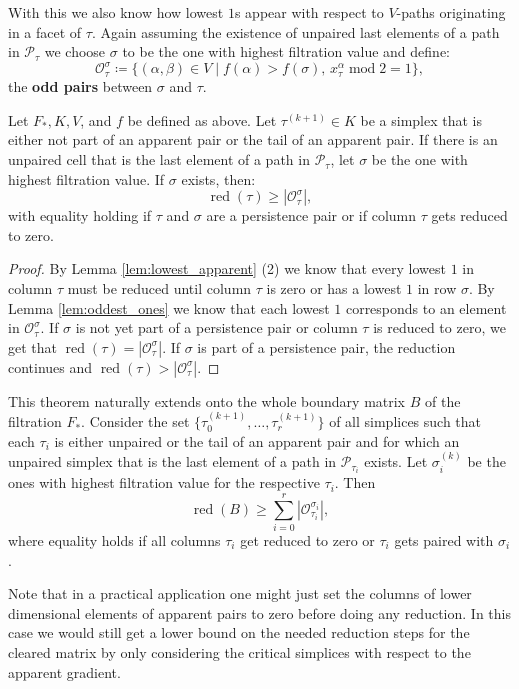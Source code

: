 With this we also know how lowest $1$s appear with respect to $V$-paths originating in a facet of $\tau$. Again assuming the existence of unpaired last elements of a path in $\mathcal{P}_\tau$ we choose $\sigma$ to be the one with highest filtration value and define: \[
\mathcal{O}_\tau^\sigma \coloneqq \{(\alpha, \beta) \in V \mid f(\alpha) > f(\sigma), \, x_\tau^\alpha \operatorname{mod} 2 = 1 \},
\]
the \textbf{odd pairs} between $\sigma$ and $\tau$. 

\begin{thm}
\label{thm:vpath_delta}
Let $F_*,K,V$, and $f$ be defined as above. Let $\tau^{(k+1)}\in K$ be a simplex that is either not part of an apparent pair or the tail of an apparent pair. If there is an unpaired cell that is the last element of a path in $\mathcal{P}_\tau$, let $\sigma$ be the one with highest filtration value. If $\sigma$ exists, then:
\[
    \operatorname{red}(\tau) \geq |\mathcal{O}_\tau^\sigma|,
\]
with equality holding if $\tau$ and $\sigma$ are a persistence pair or if column $\tau$ gets reduced to zero.
\end{thm}
\begin{proof}
By Lemma \ref{lem:lowest_apparent} (2) we know that every lowest $1$ in column $\tau$ must be reduced until column $\tau$ is zero or has a lowest $1$ in row $\sigma$. By Lemma \ref{lem:oddest_ones} we know that each lowest $1$ corresponds to an element in $\mathcal{O}_\tau^\sigma$. If $\sigma$ is not yet part of a persistence pair or column $\tau$ is reduced to zero, we get that $\operatorname{red}(\tau) = |\mathcal{O}_\tau^\sigma|$. If $\sigma$ is part of a persistence pair, the reduction continues and $\operatorname{red}(\tau) > |\mathcal{O}_\tau^\sigma|$. 
\end{proof}
This theorem naturally extends onto the whole boundary matrix $B$ of the filtration $F_*$.
Consider the set $\{\tau_0^{(k+1)}, \dots, \tau_r^{(k+1)}\}$ of all simplices such that each $\tau_i$ is either unpaired or the tail of an apparent pair and for which an unpaired simplex that is the last element of a path in $\mathcal{P}_{\tau_i}$ exists. Let $\sigma_i^{(k)}$ be the ones with highest filtration value for the respective $\tau_i$. Then \[
\operatorname{red}(B) \geq \sum_{i=0}^r|\mathcal{O}_{\tau_i}^{\sigma_i}|,
\]
where equality holds if all columns $\tau_i$ get reduced to zero or $\tau_i$ gets paired with $\sigma_i$.

Note that in a practical application one might just set the columns of lower dimensional elements of apparent pairs to zero before doing any reduction. In this case we would still get a lower bound on the needed reduction steps for the cleared matrix by only considering the critical simplices with respect to the apparent gradient.

